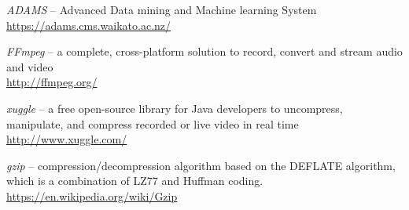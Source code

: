 %

\begin{thebibliography}{999}

		\textit{ADAMS} -- Advanced Data mining and Machine learning System \\
		\url{https://adams.cms.waikato.ac.nz/}{}

		\textit{FFmpeg} -- a complete, cross-platform solution to record,
		convert and stream audio and video \\
		\url{http://ffmpeg.org/}{}

		\textit{xuggle} -- a free open-source library for Java developers
		to uncompress, manipulate, and compress recorded or live video in real time \\
		\url{http://www.xuggle.com/}{}

		\textit{gzip} -- compression/decompression algorithm based on
		the DEFLATE algorithm, which is a combination of LZ77 and Huffman
		coding. \\
		\url{https://en.wikipedia.org/wiki/Gzip}{}

\end{thebibliography}
